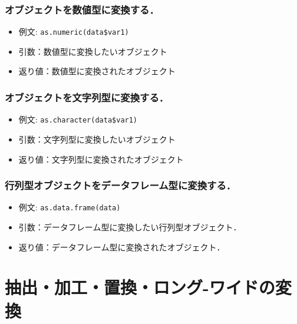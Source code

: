 \documentclass[
  xelatex, ja=standard]{bxjsarticle}
\providecommand{\tightlist}{%
  \setlength{\itemsep}{0pt}\setlength{\parskip}{0pt}}
\begin{document}
\subsubsection{オブジェクトを数値型に変換する．}\label{ux30aaux30d6ux30b8ux30a7ux30afux30c8ux3092ux6570ux5024ux578bux306bux5909ux63dbux3059ux308b}

\begin{itemize}
\tightlist
\item
  例文: \texttt{as.numeric(data\$var1)}
\item
  引数：数値型に変換したいオブジェクト
\item
  返り値：数値型に変換されたオブジェクト
\end{itemize}

\subsubsection{オブジェクトを文字列型に変換する．}\label{ux30aaux30d6ux30b8ux30a7ux30afux30c8ux3092ux6587ux5b57ux5217ux578bux306bux5909ux63dbux3059ux308b}

\begin{itemize}
\tightlist
\item
  例文: \texttt{as.character(data\$var1)}
\item
  引数：文字列型に変換したいオブジェクト
\item
  返り値：文字列型に変換されたオブジェクト
\end{itemize}

\subsubsection{行列型オブジェクトをデータフレーム型に変換する．}\label{ux884cux5217ux578bux30aaux30d6ux30b8ux30a7ux30afux30c8ux3092ux30c7ux30fcux30bfux30d5ux30ecux30fcux30e0ux578bux306bux5909ux63dbux3059ux308b}

\begin{itemize}
\tightlist
\item
  例文: \texttt{as.data.frame(data)}
\item
  引数：データフレーム型に変換したい行列型オブジェクト．
\item
  返り値：データフレーム型に変換されたオブジェクト．
\end{itemize}

\section{抽出・加工・置換・ロング-ワイドの変換}\label{ux62bdux51faux52a0ux5de5ux7f6eux63dbux30edux30f3ux30b0-ux30efux30a4ux30c9ux306eux5909ux63db}
\end{document}
